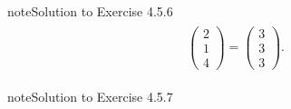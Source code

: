 \documentclass[letterpaper,10pt,english]{jupyterBook}
\begin{document}
\begin{sphinxadmonition}{note}{Solution to Exercise 4.5.6}
\begin{equation*}
\begin{split}
\begin{align*}
    \begin{pmatrix} 2 \\ 1 \\ 4 \end{pmatrix} =
    \begin{pmatrix} 3 \\ 3 \\ 3 \end{pmatrix}.
\end{align*} \end{split}
\end{equation*}\end{sphinxadmonition}
 \label{_pages/A4_Coordinate_geometry_exercises_solutions:_pages/A4_Coordinate_geometry_exercises_solutions-solution-6}

\begin{sphinxadmonition}{note}{Solution to Exercise 4.5.7}




\end{sphinxadmonition}
\end{document}
